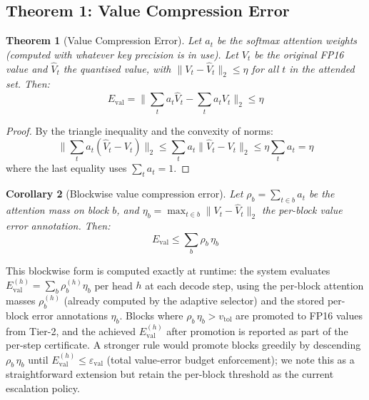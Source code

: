 \documentclass[11pt,a4paper]{article}
\newtheorem{theorem}{Theorem}[section]
\newtheorem{corollary}[theorem]{Corollary}
\theoremstyle{definition}
\theoremstyle{remark}
\newcommand{\norm}[1]{\lVert #1 \rVert}
\begin{document}
\subsection{Theorem 1: Value Compression Error}
\label{sec:val_error}

\begin{theorem}[Value Compression Error]
\label{thm:val}
Let $a_t$ be the softmax attention weights (computed with whatever key precision is in use).  Let $V_t$ be the original FP16 value and $\hat{V}_t$ the quantised value, with $\norm{V_t - \hat{V}_t}_2 \leq \eta$ for all $t$ in the attended set.  Then:
\begin{equation}
  E_{\mathrm{val}} = \norm{\sum_t a_t \hat{V}_t - \sum_t a_t V_t}_2 \leq \eta
\end{equation}
\end{theorem}

\begin{proof}
By the triangle inequality and the convexity of norms:
\[
  \norm{\sum_t a_t (\hat{V}_t - V_t)}_2 \leq \sum_t a_t \norm{\hat{V}_t - V_t}_2 \leq \eta \sum_t a_t = \eta
\]
where the last equality uses $\sum_t a_t = 1$.
\end{proof}

\begin{corollary}[Blockwise value compression error]
\label{cor:val_block}
Let $\rho_b = \sum_{t \in b} a_t$ be the attention mass on block $b$, and $\eta_b = \max_{t \in b} \norm{V_t - \hat{V}_t}_2$ the per-block value error annotation.  Then:
\begin{equation}
  E_{\mathrm{val}} \leq \sum_b \rho_b \,\eta_b
  \label{eq:val_block}
\end{equation}
\end{corollary}

This blockwise form is computed exactly at runtime: the system evaluates
$E_{\mathrm{val}}^{(h)} = \sum_b \rho_b^{(h)} \eta_b$ per head $h$ at each decode step, using the per-block attention masses $\rho_b^{(h)}$ (already computed by the adaptive selector) and the stored per-block error annotations $\eta_b$.  Blocks where $\rho_b \,\eta_b > v_{\mathrm{tol}}$ are promoted to FP16 values from Tier-2, and the achieved $E_{\mathrm{val}}^{(h)}$ after promotion is reported as part of the per-step certificate.  A stronger rule would promote blocks greedily by descending $\rho_b \,\eta_b$ until $E_{\mathrm{val}}^{(h)} \leq \varepsilon_{\mathrm{val}}$ (total value-error budget enforcement); we note this as a straightforward extension but retain the per-block threshold as the current escalation policy.
\end{document}
